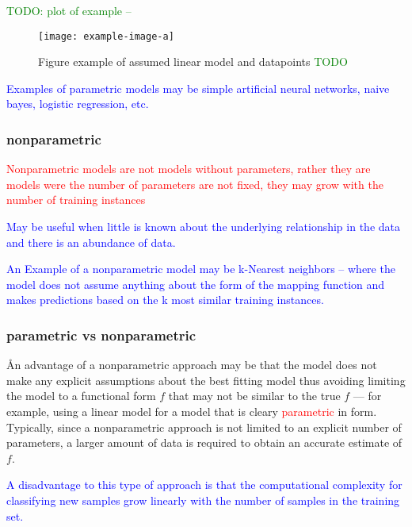 \textcolor{green}{TODO: plot of example -- }

\begin{figure}[htp]
	\centering
	\texttt{[image: example-image-a]}\hfil
	\caption{Figure example of assumed linear model and datapoints \textcolor{green}{TODO}}
	\label{fig:basics_para_assume_linear}
\end{figure}



\textcolor{blue}{Examples of parametric models may be simple artificial neural networks, naive bayes, logistic regression, etc.}

\subsubsection{nonparametric}

\textcolor{red}{Nonparametric models are not models without parameters, rather they are models were the number of parameters are not fixed, they may grow with the number of training instances}

\textcolor{blue}{May be useful when little is known about the underlying relationship in the data and there is an abundance of data.}

\textcolor{blue}{An Example of a nonparametric model may be k-Nearest neighbors -- where the model does not assume anything about the form of the mapping function and makes predictions based on the k most similar training instances.}

\subsubsection{parametric vs nonparametric}

\r{An advantage of a nonparametric approach may be that the model does not make any explicit assumptions about the best fitting model thus avoiding limiting the model to a functional form $f$ that may not be similar to the true $f$ --- for example, using a linear model for a model that is cleary \textcolor{red}{parametric} in form. Typically, since a nonparametric approach is not limited to an explicit number of parameters, a larger amount of data is required to obtain an accurate estimate of $f$.}

\textcolor{blue}{A disadvantage to this type of approach is that the computational complexity for classifying new samples grow linearly with the number of samples in the training set.}



